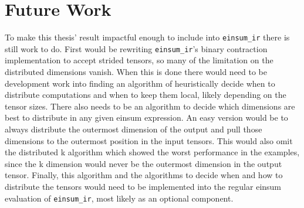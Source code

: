 \section{Future Work}

To make this thesis' result impactful enough to include into \texttt{einsum\_ir} there is still work to do.
First would be rewriting \texttt{einsum\_ir}'s binary contraction implementation to accept strided tensors, so many of the limitation on the distributed dimensions vanish.
When this is done there would need to be development work into finding an algorithm of heuristically decide when to distribute computations and when to keep them local, likely depending on the tensor sizes.
There also needs to be an algorithm to decide which dimensions are best to distribute in any given einsum expression.
An easy version would be to always distribute the outermost dimension of the output and pull those dimensions to the outermost position in the input tensors.
This would also omit the distributed k algorithm which showed the worst performance in the examples, since the k dimension would never be the outermost dimension in the output tensor.
Finally, this algorithm and the algorithms to decide when and how to distribute the tensors would need to be implemented into the regular einsum evaluation of \texttt{einsum\_ir}, most likely as an optional component.